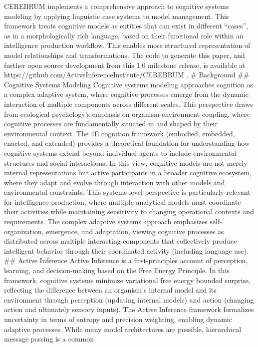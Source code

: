 \documentclass[
  11pt,
  letterpaper,
]{article}
\begin{document}
CEREBRUM implements a comprehensive approach to cognitive systems
modeling by applying linguistic case systems to model management. This
framework treats cognitive models as entities that can exist in
different ``cases'', as in a morphologically rich language, based on
their functional role within an intelligence production workflow. This
enables more structured representation of model relationships and
transformations. The code to generate this paper, and further open
source development from this 1.0 milestone release, is available at
https://github.com/ActiveInferenceInstitute/CEREBRUM . \# Background
\#\# Cognitive Systems Modeling Cognitive systems modeling approaches
cognition as a complex adaptive system, where cognitive processes emerge
from the dynamic interaction of multiple components across different
scales. This perspective draws from ecological psychology's emphasis on
organism-environment coupling, where cognitive processes are
fundamentally situated in and shaped by their environmental context. The
4E cognition framework (embodied, embedded, enacted, and extended)
provides a theoretical foundation for understanding how cognitive
systems extend beyond individual agents to include environmental
structures and social interactions. In this view, cognitive models are
not merely internal representations but active participants in a broader
cognitive ecosystem, where they adapt and evolve through interaction
with other models and environmental constraints. This systems-level
perspective is particularly relevant for intelligence production, where
multiple analytical models must coordinate their activities while
maintaining sensitivity to changing operational contexts and
requirements. The complex adaptive systems approach emphasizes
self-organization, emergence, and adaptation, viewing cognitive
processes as distributed across multiple interacting components that
collectively produce intelligent behavior through their coordinated
activity (including language use). \#\# Active Inference Active
Inference is a first-principles account of perception, learning, and
decision-making based on the Free Energy Principle. In this framework,
cognitive systems minimize variational free energy bounded surprise,
reflecting the difference between an organism's internal model and its
environment through perception (updating internal models) and action
(changing action and ultimately sensory inputs). The Active Inference
framework formalizes uncertainty in terms of entropy and precision
weighting, enabling dynamic adaptive processes. While many model
architectures are possible, hierarchical message passing is a common
\end{document}
